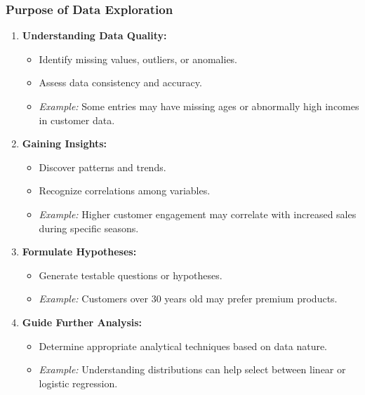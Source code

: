 \documentclass[aspectratio=169]{beamer}
\begin{document}
\begin{frame}[fragile]
  \frametitle{Purpose of Data Exploration}
  \begin{enumerate}
    \item \textbf{Understanding Data Quality:} 
      \begin{itemize}
        \item Identify missing values, outliers, or anomalies.
        \item Assess data consistency and accuracy.
        \item \textit{Example:} Some entries may have missing ages or abnormally high incomes in customer data.
      \end{itemize}
    
    \item \textbf{Gaining Insights:} 
      \begin{itemize}
        \item Discover patterns and trends.
        \item Recognize correlations among variables.
        \item \textit{Example:} Higher customer engagement may correlate with increased sales during specific seasons.
      \end{itemize}
    
    \item \textbf{Formulate Hypotheses:} 
      \begin{itemize}
        \item Generate testable questions or hypotheses.
        \item \textit{Example:} Customers over 30 years old may prefer premium products.
      \end{itemize}
    
    \item \textbf{Guide Further Analysis:} 
      \begin{itemize}
        \item Determine appropriate analytical techniques based on data nature.
        \item \textit{Example:} Understanding distributions can help select between linear or logistic regression.
      \end{itemize}
  \end{enumerate}
\end{frame}
\end{document}
